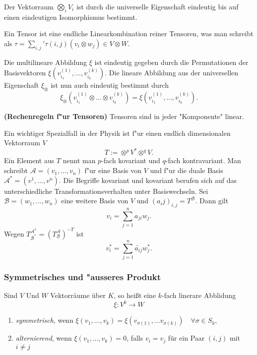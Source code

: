 \documentclass[8pt, a4paper, twocolumn, landscape]{article}
\begin{document}
\begin{remark}
Der Vektorraum $\bigotimes\limits_i V_i$ ist durch die universelle Eigenschaft eindeutig bis auf einen eindeutigen Isomorphismus bestimmt. 
\end{remark}

\begin{remark}
Ein Tensor ist eine endliche Linearkombination reiner Tensoren, was man schreibt als $\tau = \sum\limits_{i, j} ' \tau(i, j) (v_i \otimes w_j) \in V \otimes W$.

Die multilineare Abbildung $\xi$ ist eindeutig gegeben durch die Permutationen der Basisvektoren $\xi(v_{i_1}^{(1)}, ..., v_{i_k}^{(k)})$.
Die lineare Abbildung aus der universellen Eigenschaft $\xi_\otimes$ ist nun auch eindeutig bestimmt durch 
$$
\xi_\otimes(v_{i_1}^{(1)} \otimes ... \otimes v_{i_k}^{(k)}) = \xi(v_{i_1}^{(1)}, ..., v_{i_k}^{(k)}).
$$
\end{remark}

\begin{remark} \textbf{(Rechenregeln f"ur Tensoren)}
Tensoren sind in jeder  "Komponente"  linear.
\end{remark}


\begin{remark}
Ein wichtiger Spezialfall in der Physik ist f"ur einen endlich dimensionalen Vektorraum $V$
$$
T:= \otimes^p V^* \otimes^q V.
$$
Ein Element aus $T$ nennt man $p$-fach kovariant und $q$-fach kontravariant. Man schreibt $\mathcal{A} = (v_1, ..., v_n)$ f"ur eine Basis von $V$ und f"ur die duale Basis $\mathcal{A}^* = (v^1, ..., v^n)$.
Die Begriffe kovariant und kovariant berufen sich auf das unterschiedliche Transformationsverhalten unter Basiswechseln. Sei $\mathcal{B} = (w_1, ..., w_n)$ eine weitere Basis von $V$ und $(a_ij)_{i, j} = T^\mathcal{B}$. Dann gilt
$$
v_i =\sum\limits_{j = 1}^n a_{ji}w_j.
$$
Wegen $T^{\mathcal{A}^*}_{\mathcal{B}^*} = (T^{\mathcal{A}}_{\mathcal{B}})^{-T}$ ist 
$$
v_i^* =\sum\limits_{j = 1}^n \tilde{a_{ij}}w_j^*.
$$
\end{remark}


\subsubsection{Symmetrisches und "ausseres Produkt}
\begin{definition}
Sind $V$ Und $W$ Vektorräume über $K$, so heißt eine $k$-fach linerare Abblidung
$$
\xi: V^k \rightarrow W
$$
\begin{enumerate}
\item  \emph{symmetrisch}, wenn $\xi(v_1,...,v_k) = \xi(v_{\sigma(1)},...v_{\sigma(k)})\quad \forall \sigma \in S_k$,
\item \emph{alternierend}, wenn $\xi(v_1,...,v_k) = 0 $, falls $ v_i = v_j$ für ein Paar $(i,j)$ mit $i \neq j$
\end{enumerate}
\end{definition}
\end{document}
